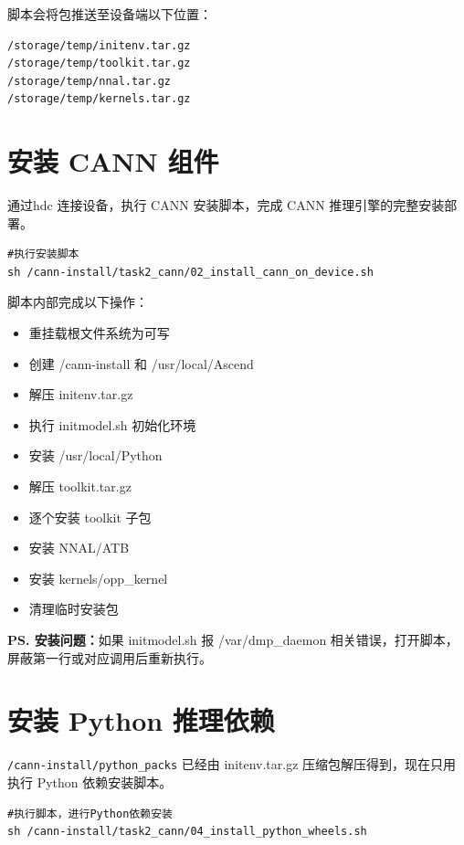 脚本会将包推送至设备端以下位置：

\begin{lstlisting}[caption={设备端包路径}]
/storage/temp/initenv.tar.gz
/storage/temp/toolkit.tar.gz
/storage/temp/nnal.tar.gz
/storage/temp/kernels.tar.gz
\end{lstlisting}

\section{安装 CANN 组件}

通过hdc 连接设备，执行 CANN 安装脚本，完成 CANN 推理引擎的完整安装部署。

\begin{lstlisting}[style=shell, caption={安装 CANN}]
#执行安装脚本
sh /cann-install/task2_cann/02_install_cann_on_device.sh
\end{lstlisting}

脚本内部完成以下操作：

\begin{itemize}
  \item 重挂载根文件系统为可写
  \item 创建 /cann-install 和 /usr/local/Ascend
  \item 解压 initenv.tar.gz
  \item 执行 initmodel.sh 初始化环境
  \item 安装 /usr/local/Python
  \item 解压 toolkit.tar.gz
  \item 逐个安装 toolkit 子包
  \item 安装 NNAL/ATB
  \item 安装 kernels/opp\_kernel
  \item 清理临时安装包
\end{itemize}

\noindent\textbf{PS. 安装问题：}如果 initmodel.sh 报 /var/dmp\_daemon 相关错误，打开脚本，屏蔽第一行或对应调用后重新执行。

\section{安装 Python 推理依赖}

\texttt{/cann-install/python\_packs} 已经由 initenv.tar.gz 压缩包解压得到，现在只用执行 Python 依赖安装脚本。

\begin{lstlisting}[style=shell, caption={安装 Python 依赖}]
#执行脚本，进行Python依赖安装
sh /cann-install/task2_cann/04_install_python_wheels.sh
\end{lstlisting}

